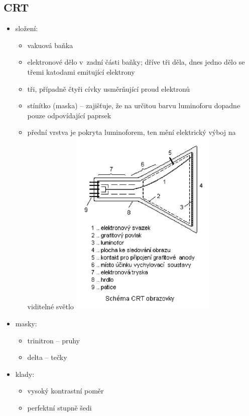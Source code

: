 \documentclass[a4paper,12pt]{article}
\providecommand{\tightlist}{%
\setlength{\itemsep}{0pt}\setlength{\parskip}{0pt}}
\begin{document}
\subsection{CRT}

\begin{itemize}
  \tightlist
  \item složení:
  \begin{itemize}
    \tightlist
    \item vakuová baňka
    \item elektronové dělo v~zadní části baňky; dříve tři děla, dnes jedno dělo
    se třemi katodami emitující elektrony
    \item tři, případně čtyři cívky usměrňující proud elektronů
    \item stínítko (maska) -- zajišťuje, že na určitou barvu luminoforu dopadne
    pouze odpovídající paprsek
    \item přední vrstva je pokryta luminoforem, ten mění elektrický výboj na
    viditelné světlo
    \includegraphics[width=7cm]{ref/schema-crt-obrazovky.png}
  \end{itemize}
  \item masky:
  \begin{itemize}
    \tightlist
    \item trinitron -- pruhy
    \item delta -- tečky
  \end{itemize}
  \item klady:
  \begin{itemize}
    \tightlist
    \item vysoký kontrastní poměr
    \item perfektní stupně šedi

\end{itemize}
\end{itemize}
\end{document}
